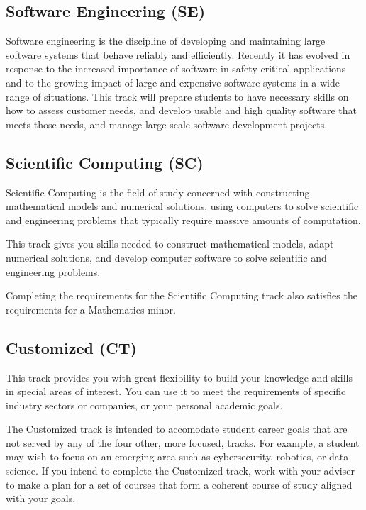 \documentclass{book}
\begin{document}
\subsection{Software Engineering (SE)}
Software engineering is the discipline of developing and maintaining large software systems that behave reliably and efficiently. Recently it has evolved in response to the increased importance of software in safety-critical applications and to the growing impact of large and expensive software systems in a wide range of situations. This track will prepare students to have necessary skills on how to assess customer needs, and develop usable and high quality software that meets those needs, and manage large scale software development projects.

\subsection{Scientific Computing (SC)}

Scientific Computing is the field of study concerned with constructing mathematical models and numerical solutions, using computers to solve scientific and engineering problems that typically require massive amounts of computation.

This track gives you skills needed to construct mathematical models, adapt numerical solutions, and develop computer software to solve scientific and engineering problems.

Completing the requirements for the Scientific Computing track also satisfies the requirements for a Mathematics minor.

\subsection{Customized (CT)}

This track provides you with great flexibility to build your knowledge and skills in special areas of interest. You can use it to meet the requirements of specific industry sectors or companies, or your personal academic goals.

The Customized track is intended to accomodate student career goals that are not served by any of the four other, more focused, tracks. For example, a student may wish to focus on an emerging area such as cybersecurity, robotics, or data science. If you intend to complete the Customized track, work with your adviser to make a plan for a set of courses that form a coherent course of study aligned with your goals.
\end{document}
